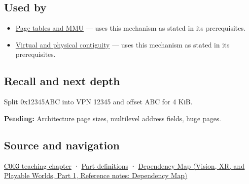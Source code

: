\subsection{Used by}\label{appendix-0c67cd5bf30a-used-by}

\hypertarget{appendix-0c67cd5bf30a-used-by}{}

\begin{itemize}
\tightlist
\item
  \hyperref[appendix-01e5905165c4]{Page tables and MMU} --- uses this mechanism as stated in its prerequisites.
\item
  \hyperref[appendix-f897c1ddac8f]{Virtual and physical contiguity} --- uses this mechanism as stated in its prerequisites.
\end{itemize}

\subsection{Recall and next depth}\label{appendix-0c67cd5bf30a-recall-and-next-depth}

\hypertarget{appendix-0c67cd5bf30a-recall-and-next-depth}{}

Split 0x12345ABC into VPN 12345 and offset ABC for 4 KiB.

\textbf{Pending:} Architecture page sizes, multilevel address fields, huge pages.

\subsection{Source and navigation}\label{appendix-0c67cd5bf30a-source-and-navigation}

\hypertarget{appendix-0c67cd5bf30a-source-and-navigation}{}

\hyperref[01-foundations-i-ch002-where-the-bytes-live]{C003 teaching chapter} · \hyperref[appendix-fd090d982a15-m003---parts-41-60]{Part definitions} · \href{../07-Vision-XR-and-Playable-Worlds-P01/main.pdf\#nameddest=appendix-4ad47bdd269a}{Dependency Map (Vision, XR, and Playable Worlds, Part 1, Reference notes: Dependency Map)}
